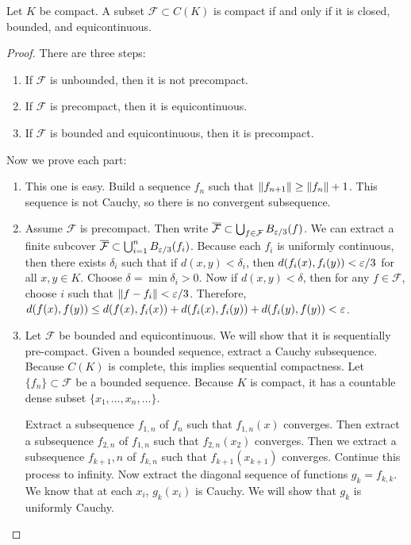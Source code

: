 \documentclass[10pt, twoside]{article}
\begin{document}
    \begin{thm} Let $K$ be compact. A subset
        $\mathcal{F} \subset C(K)$ is compact if and only if it is closed,
        bounded, and equicontinuous.  \begin{proof} There are three steps:
            \begin{enumerate} \item If $\mathcal{F}$ is unbounded, then it is
                not precompact.  \item If $\mathcal{F}$ is precompact, then it
            is equicontinuous.  \item If $\mathcal{F}$ is bounded and
        equicontinuous, then it is precompact.  \end{enumerate} Now we prove
        each part: \begin{enumerate} \item This one is easy. Build a sequence
            $f_n$ such that $\lVert f_{n+1}\rVert \geq \lVert f_n\rVert + 1$. This sequence
            is not Cauchy, so there is no convergent subsequence.  \item Assume
            $\mathcal{F}$ is precompact. Then write $\overline{\mathcal{F}}
            \subset \bigcup_{f \in \mathcal{F}} B_{\varepsilon/3}(f)$. We can extract a
            finite subcover $\overline{\mathcal{F}} \subset \bigcup_{i=1}^n
            B_{\varepsilon/3}(f_i)$. Because each $f_i$ is uniformly continuous, then
            there exists $\delta_i$ such that if $d(x,y) < \delta_i$, then
            $d(f_i(x), f_i(y)) < \varepsilon/3$ for all $x,y \in K$. Choose $\delta =
            \min \delta_i > 0$. Now if $d(x,y) < \delta$, then for any $f \in
            \mathcal{F}$, choose $i$ such that $\lVert f-f_i\rVert < \varepsilon/3$.
            Therefore, $d(f(x), f(y)) \leq d(f(x), f_i(x)) + d(f_i(x), f_i(y))
            + d(f_i(y), f(y)) < \varepsilon$.  \item Let $\mathcal{F}$ be bounded and
            equicontinuous. We will show that it is sequentially pre-compact.
            Given a bounded sequence, extract a Cauchy subsequence. Because
            $C(K)$ is complete, this implies sequential compactness. Let
            $\{f_n\} \subset \mathcal{F}$ be a bounded sequence. Because $K$ is
            compact, it has a countable dense subset $\{x_1, \ldots, x_n,
            \ldots\}$.
                
                Extract a subsequence $f_{1,n}$ of $f_n$ such that $f_{1,n}(x)$
                converges. Then extract a subsequence $f_{2,n}$ of $f_{1,n}$
                such that $f_{2,n}(x_2)$ converges. Then we extract a
                subsequence $f_{k+1}, n$ of $f_{k,n}$ such that
                $f_{k+1}(x_{k+1})$ converges. Continue this process to
                infinity. Now extract the diagonal sequence of functions $g_k =
                f_{k,k}$. We know that at each $x_i$, $g_k(x_i)$ is Cauchy. We
                will show that $g_k$ is uniformly Cauchy.


\end{enumerate}
\end{proof}
\end{thm}
\end{document}
